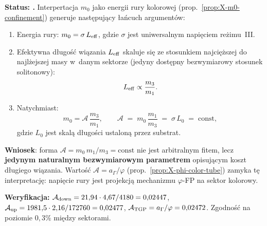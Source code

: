 \begin{proposition}[Uzasadnienie $\mathcal{A} = m_0 m_1/m_3$
  jako jedynej naturalnej sta\l{}ej sektora (v47b)]%
\label{prop:X-A-from-binding}
\textbf{Status: .}
Interpertacja $m_0$ jako energii rury kolorowej
(prop.~\ref{prop:X-m0-confinement}) generuje nast\k{e}puj\k{a}cy
\l{}a\'ncuch argument\'ow:

\begin{enumerate}[nosep]
  \item Energia rury: $m_0 = \sigma\,L_{\rm eff}$, gdzie $\sigma$
    jest uniwersalnym napi\k{e}ciem re\.zimu~III.
  \item Efektywna d\l{}ugo\'s\'c wiązania $L_{\rm eff}$ skaluje si\k{e}
    ze stosunkiem najci\k{e}\.zszej do najl\.zejszej masy
    w~danym sektorze (jedyny dost\k{e}pny bezwymiarowy stosunek
    solitonowy):
    \begin{equation}
      L_{\rm eff} \propto \frac{m_3}{m_1}.
    \end{equation}
  \item Natychmiast:
    \begin{equation}
      m_0 = \mathcal{A}\,\frac{m_3}{m_1},
      \qquad
      \mathcal{A} \;=\; m_0\,\frac{m_1}{m_3}
      \;=\; \sigma\,L_0 \;=\; \mathrm{const},
    \end{equation}
    gdzie $L_0$ jest skal\k{a} d\l{}ugo\'sci ustalon\k{a} przez substrat.
\end{enumerate}

\textbf{Wniosek}: forma $\mathcal{A} = m_0\,m_1/m_3 = \mathrm{const}$
nie jest arbitralnym fitem, lecz \textbf{jedynym naturalnym
bezwymiarowym parametrem} opisuj\k{a}cym koszt d\l{}ugiego wi\k{a}zania.
Warto\'s\'c $\mathcal{A} = a_\Gamma/\varphi$
(prop.~\ref{prop:X-phi-color-tube})
zamyka t\k{e} interpretacj\k{e}: napi\k{e}cie rury jest projekcj\k{a}
mechanizmu $\varphi$-FP na sektor kolorowy.

\medskip\noindent
\textbf{Weryfikacja:}
$\mathcal{A}_{\rm down} = 21{,}94 \cdot 4{,}67/4180 = 0{,}02447$,
$\mathcal{A}_{\rm up} = 1981{,}5 \cdot 2{,}16/172760 = 0{,}02477$,
$\mathcal{A}_{\rm TGP} = a_\Gamma/\varphi = 0{,}02472$.
Zgodno\'s\'c na poziomie $0{,}3\%$ mi\k{e}dzy sektorami.
\end{proposition}


